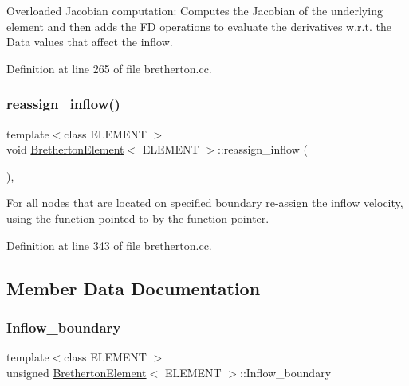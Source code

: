 Overloaded Jacobian computation\+: Computes the Jacobian of the underlying element and then adds the FD operations to evaluate the derivatives w.\+r.\+t. the Data values that affect the inflow. 

Definition at line 265 of file bretherton.\+cc.

\mbox{\label{classBrethertonElement_a7e655df2ed6104862cc70c2408daf93c}} 
\subsubsection{\texorpdfstring{reassign\+\_\+inflow()}{reassign\_inflow()}}
{\footnotesize\ttfamily template$<$class E\+L\+E\+M\+E\+NT $>$ \\
void \hyperlink{classBrethertonElement}{Bretherton\+Element}$<$ E\+L\+E\+M\+E\+NT $>$\+::reassign\+\_\+inflow (\begin{DoxyParamCaption}{ }\end{DoxyParamCaption})\hspace{0.3cm}{\ttfamily [inline]}, {\ttfamily [private]}}



For all nodes that are located on specified boundary re-\/assign the inflow velocity, using the function pointed to by the function pointer. 



Definition at line 343 of file bretherton.\+cc.



\subsection{Member Data Documentation}
\mbox{\label{classBrethertonElement_a2d3a3d4837d41865d5f62271c98715c5}} 
\subsubsection{\texorpdfstring{Inflow\+\_\+boundary}{Inflow\_boundary}}
{\footnotesize\ttfamily template$<$class E\+L\+E\+M\+E\+NT $>$ \\
unsigned \hyperlink{classBrethertonElement}{Bretherton\+Element}$<$ E\+L\+E\+M\+E\+NT $>$\+::Inflow\+\_\+boundary\hspace{0.3cm}{\ttfamily [private]}}



